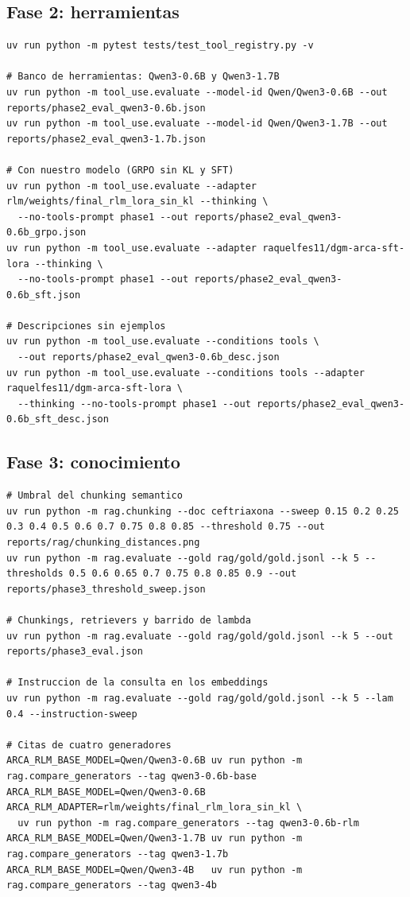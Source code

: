\subsection*{Fase 2: herramientas}
\begin{lstlisting}
uv run python -m pytest tests/test_tool_registry.py -v

# Banco de herramientas: Qwen3-0.6B y Qwen3-1.7B
uv run python -m tool_use.evaluate --model-id Qwen/Qwen3-0.6B --out reports/phase2_eval_qwen3-0.6b.json
uv run python -m tool_use.evaluate --model-id Qwen/Qwen3-1.7B --out reports/phase2_eval_qwen3-1.7b.json

# Con nuestro modelo (GRPO sin KL y SFT)
uv run python -m tool_use.evaluate --adapter rlm/weights/final_rlm_lora_sin_kl --thinking \
  --no-tools-prompt phase1 --out reports/phase2_eval_qwen3-0.6b_grpo.json
uv run python -m tool_use.evaluate --adapter raquelfes11/dgm-arca-sft-lora --thinking \
  --no-tools-prompt phase1 --out reports/phase2_eval_qwen3-0.6b_sft.json

# Descripciones sin ejemplos
uv run python -m tool_use.evaluate --conditions tools \
  --out reports/phase2_eval_qwen3-0.6b_desc.json
uv run python -m tool_use.evaluate --conditions tools --adapter raquelfes11/dgm-arca-sft-lora \
  --thinking --no-tools-prompt phase1 --out reports/phase2_eval_qwen3-0.6b_sft_desc.json
\end{lstlisting}

\subsection*{Fase 3: conocimiento}
\begin{lstlisting}
# Umbral del chunking semantico
uv run python -m rag.chunking --doc ceftriaxona --sweep 0.15 0.2 0.25 0.3 0.4 0.5 0.6 0.7 0.75 0.8 0.85 --threshold 0.75 --out reports/rag/chunking_distances.png
uv run python -m rag.evaluate --gold rag/gold/gold.jsonl --k 5 --thresholds 0.5 0.6 0.65 0.7 0.75 0.8 0.85 0.9 --out reports/phase3_threshold_sweep.json

# Chunkings, retrievers y barrido de lambda
uv run python -m rag.evaluate --gold rag/gold/gold.jsonl --k 5 --out reports/phase3_eval.json

# Instruccion de la consulta en los embeddings
uv run python -m rag.evaluate --gold rag/gold/gold.jsonl --k 5 --lam 0.4 --instruction-sweep

# Citas de cuatro generadores
ARCA_RLM_BASE_MODEL=Qwen/Qwen3-0.6B uv run python -m rag.compare_generators --tag qwen3-0.6b-base
ARCA_RLM_BASE_MODEL=Qwen/Qwen3-0.6B ARCA_RLM_ADAPTER=rlm/weights/final_rlm_lora_sin_kl \
  uv run python -m rag.compare_generators --tag qwen3-0.6b-rlm
ARCA_RLM_BASE_MODEL=Qwen/Qwen3-1.7B uv run python -m rag.compare_generators --tag qwen3-1.7b
ARCA_RLM_BASE_MODEL=Qwen/Qwen3-4B   uv run python -m rag.compare_generators --tag qwen3-4b
\end{lstlisting}


